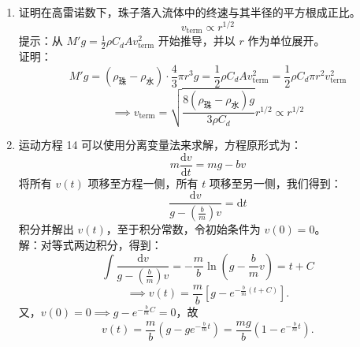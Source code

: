 \documentclass[a4paper]{article}
\begin{document}
\begin{enumerate}[label=\chinese*.,left=0pt]
\begin{enumerate}[label=\arabic*.,left = 0pt]
        \item 证明在高雷诺数下，珠子落入流体中的终速与其半径的平方根成正比。
        \begin{equation*}
            v_{\text{term}} \propto r^{1/2}
        \end{equation*}
        提示：从 $M' g = \frac{1}{2} \rho C_d A v_{\text{term}}^2$ 开始推导，并以 $r$ 作为单位展开。
        \\[2.5mm]
        证明：
        $$M'g = (\rho_{\text{珠}}-\rho_{\text{水}}) \cdot \frac{4}{3} \pi r^3 g = \frac{1}{2} \rho C_d A v_{\text{term}}^2 = \frac{1}{2} \rho C_d \pi r^2 v_{\text{term}}^2$$
        $$\implies v_{\text{term}}= \sqrt{\frac{8(\rho_{\text{珠}}-\rho_{\text{水}})g}{3\rho C_d}} r^{1/2} \propto r^{1/2}$$

        \item 运动方程 14 可以使用分离变量法来求解，方程原形式为：
        \begin{equation*}
            m \frac{\mathrm{d}v}{\mathrm{d}t} = mg - bv
        \end{equation*}
        将所有 $v(t)$ 项移至方程一侧，所有 $t$ 项移至另一侧，我们得到：
        \begin{equation*}
            \frac{\mathrm{d}v}{g-\left(\frac{b}{m}\right) v} = \mathrm{d}t
        \end{equation*}
        积分并解出 $v(t)$，至于积分常数，令初始条件为 $v(0) = 0$。
        \\[2.5mm]
        解：对等式两边积分，得到：
        $$\int \frac{\mathrm{d}v}{g- \left(\frac{b}{m}\right)v}= -\frac{m}{b} \ln \left( g- \frac{b}{m}v \right) = t+C$$
        $$\implies v(t) = \frac{m}{b} \left[g-e^{-\frac{b}{m}(t+C)}\right].$$
        又，$v(0)=0 \implies g-e^{-\frac{b}{m}C} = 0$，故
        $$v(t) = \frac{m}{b} \left(g-ge^{-\frac{b}{m}t}\right)= \frac{mg}{b}\left(1-e^{-\frac{b}{m}t} \right).$$
    \end{enumerate}
\end{enumerate}
\end{document}
